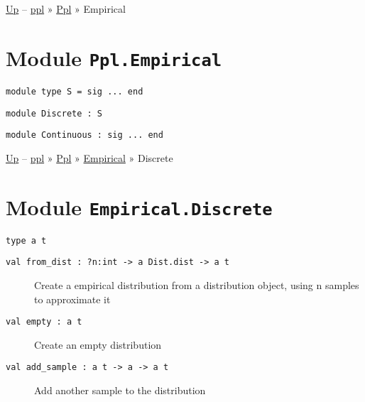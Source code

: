 \href{../index.html}{Up} -- \href{../../index.html}{ppl} »
\href{../index.html}{Ppl} » Empirical

\section{\texorpdfstring{Module
\texttt{Ppl.Empirical}}{Module Ppl.Empirical}}\label{module-ppl.empirical}

\hypertarget{module-type-S}{}
\protect\hyperlink{module-type-S}{}\texttt{module\ type\ S\ =\ sig\ ...\ end}

\hypertarget{module-Discrete}{}
\protect\hyperlink{module-Discrete}{}\texttt{module\ Discrete\ :\ S}

\hypertarget{module-Continuous}{}
\protect\hyperlink{module-Continuous}{}\texttt{module\ Continuous\ :\ sig\ ...\ end}

\href{../index.html}{Up} -- \href{../../../index.html}{ppl} »
\href{../../index.html}{Ppl} » \href{../index.html}{Empirical} »
Discrete

\section{\texorpdfstring{Module
\texttt{Empirical.Discrete}}{Module Empirical.Discrete}}\label{module-empirical.discrete}

\protect\hyperlink{type-t}{}\texttt{type\ \textquotesingle{}a\ t}

\begin{description}
\item[{\protect\hyperlink{val-fromux5fdist}{}\texttt{val\ from\_dist\ :\ ?⁠n:int\ -\textgreater{}\ \textquotesingle{}a\ Dist.dist\ -\textgreater{}\ \textquotesingle{}a\ t}}]
Create a empirical distribution from a distribution object, using n
samples to approximate it
\end{description}

\begin{description}
\item[{\protect\hyperlink{val-empty}{}\texttt{val\ empty\ :\ \textquotesingle{}a\ t}}]
Create an empty distribution
\end{description}

\begin{description}
\item[{\protect\hyperlink{val-addux5fsample}{}\texttt{val\ add\_sample\ :\ \textquotesingle{}a\ t\ -\textgreater{}\ \textquotesingle{}a\ -\textgreater{}\ \textquotesingle{}a\ t}}]
Add another sample to the distribution
\end{description}

